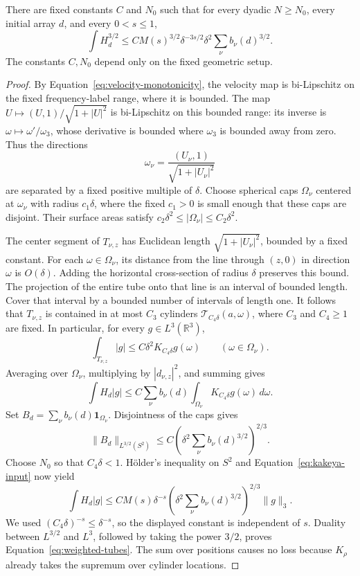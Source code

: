\begin{lemma}\label{lem:weighted}
There are fixed constants \(C\) and \(N_0\) such that for every dyadic
\(N\ge N_0\), every initial array \(d\), and every \(0<s\le1\),
\begin{equation}\label{eq:weighted-tubes}
 \int H_d^{3/2}
 \le C M(s)^{3/2}\delta^{-3s/2}
                 \delta^2\sum_\nu b_\nu(d)^{3/2}.
\end{equation}
The constants \(C,N_0\) depend only on the fixed geometric setup.
\end{lemma}

\begin{proof}
By Equation~\eqref{eq:velocity-monotonicity}, the velocity map is
bi-Lipschitz on the fixed frequency-label range, where it is bounded. The map
\(U\mapsto (U,1)/\sqrt{1+|U|^2}\) is bi-Lipschitz on this bounded
range: its inverse is \(\omega\mapsto\omega'/\omega_3\), whose
derivative is bounded where \(\omega_3\) is bounded away from zero.
Thus the directions
\[
 \omega_\nu=\frac{(U_\nu,1)}{\sqrt{1+|U_\nu|^2}}
\]
are separated by a fixed positive multiple of \(\delta\).
Choose spherical caps \(\Omega_\nu\) centered at \(\omega_\nu\)
with radius \(c_1\delta\), where the fixed \(c_1>0\) is small enough
that these caps are disjoint. Their surface areas satisfy
\(c_2\delta^2\le |\Omega_\nu|\le C_2\delta^2\).

The center segment of \(T_{\nu,z}\) has Euclidean length
\(\sqrt{1+|U_\nu|^2}\), bounded by a fixed constant. For each
\(\omega\in\Omega_\nu\), its distance from the line through
\((z,0)\) in direction \(\omega\) is \(O(\delta)\). Adding the
horizontal cross-section of radius \(\delta\) preserves this bound.
The projection of the entire tube onto that line is an interval of
bounded length. Cover that interval by a bounded number of intervals of
length one. It follows that \(T_{\nu,z}\) is contained in at most
\(C_3\) cylinders \(\mathcal T_{C_4\delta}(a,\omega)\), where
\(C_3\) and \(C_4\ge1\) are fixed. In particular, for every
\(g\in L^3(\mathbb R^3)\),
\[
 \int_{T_{\nu,z}}|g|
 \le C\delta^2 K_{C_4\delta}g(\omega)
 \qquad (\omega\in\Omega_\nu).
\]
Averaging over \(\Omega_\nu\), multiplying by \(|d_{\nu,z}|^2\),
and summing gives
\[
 \int H_d|g|
 \le C\sum_\nu b_\nu(d)
                  \int_{\Omega_\nu}K_{C_4\delta}g(\omega)\,d\omega.
\]
Set \(B_d=\sum_\nu b_\nu(d)\mathbf1_{\Omega_\nu}\). Disjointness
of the caps gives
\[
 \|B_d\|_{L^{3/2}(S^2)}
 \le C\left(\delta^2\sum_\nu b_\nu(d)^{3/2}\right)^{2/3}.
\]
Choose \(N_0\) so that \(C_4\delta<1\). H\"older's inequality on
\(S^2\) and Equation~\eqref{eq:kakeya-input} now yield
\[
 \int H_d|g|
 \le C M(s)\delta^{-s}
       \left(\delta^2\sum_\nu b_\nu(d)^{3/2}\right)^{2/3}\|g\|_3.
\]
We used \((C_4\delta)^{-s}\le\delta^{-s}\), so the displayed
constant is independent of \(s\). Duality between \(L^{3/2}\) and
\(L^3\), followed by taking the power \(3/2\), proves
Equation~\eqref{eq:weighted-tubes}. The sum over positions causes no
loss because \(K_\rho\) already takes the supremum over cylinder
locations.
\end{proof}

